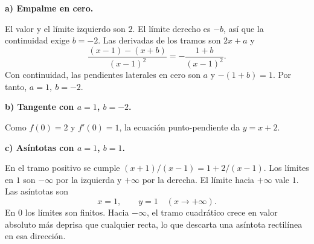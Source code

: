 \textbf{a) Empalme en cero.}\par\nopagebreak[4]
El valor y el límite izquierdo son $2$. El límite derecho es $-b$, así que la continuidad exige $b=-2$. Las derivadas de los tramos son $2x+a$ y
\[
\frac{(x-1)-(x+b)}{(x-1)^2}=-\frac{1+b}{(x-1)^2}.
\]
Con continuidad, las pendientes laterales en cero son $a$ y $-(1+b)=1$. Por tanto, $\boxed{a=1,\ b=-2}$.

\textbf{b) Tangente con $a=1$, $b=-2$.}\par\nopagebreak[4]
Como $f(0)=2$ y $f'(0)=1$, la ecuación punto-pendiente da $\boxed{y=x+2}$.

\textbf{c) Asíntotas con $a=1$, $b=1$.}\par\nopagebreak[4]
En el tramo positivo se cumple $(x+1)/(x-1)=1+2/(x-1)$. Los límites en $1$ son $-\infty$ por la izquierda y $+\infty$ por la derecha. El límite hacia $+\infty$ vale $1$. Las asíntotas son
\[
\boxed{x=1},\qquad \boxed{y=1\quad(x\to+\infty)}.
\]
En $0$ los límites son finitos. Hacia $-\infty$, el tramo cuadrático crece en valor absoluto más deprisa que cualquier recta, lo que descarta una asíntota rectilínea en esa dirección.
